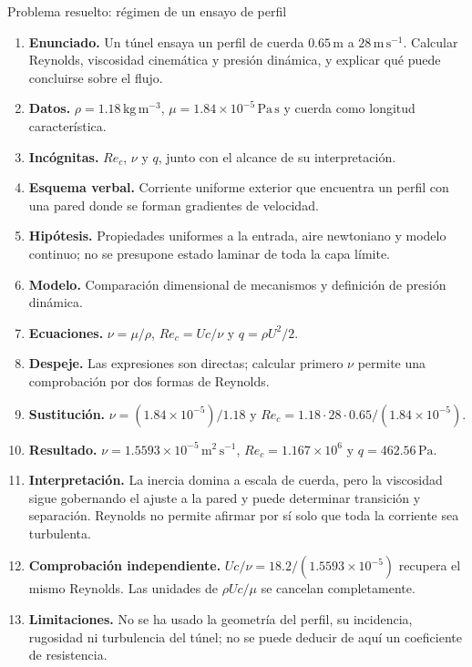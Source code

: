 \begin{studiumworked}{Problema resuelto: régimen de un ensayo de perfil}

\begin{enumerate}
\item \textbf{Enunciado.} Un túnel ensaya un perfil de cuerda $0.65\,\mathrm{m}$ a $28\,\mathrm{m\,s^{-1}}$. Calcular Reynolds, viscosidad cinemática y presión dinámica, y explicar qué puede concluirse sobre el flujo.
\item \textbf{Datos.} $\rho=1.18\,\mathrm{kg\,m^{-3}}$, $\mu=1.84\times10^{-5}\,\mathrm{Pa\,s}$ y cuerda como longitud característica.
\item \textbf{Incógnitas.} $Re_c$, $\nu$ y $q$, junto con el alcance de su interpretación.
\item \textbf{Esquema verbal.} Corriente uniforme exterior que encuentra un perfil con una pared donde se forman gradientes de velocidad.
\item \textbf{Hipótesis.} Propiedades uniformes a la entrada, aire newtoniano y modelo continuo; no se presupone estado laminar de toda la capa límite.
\item \textbf{Modelo.} Comparación dimensional de mecanismos y definición de presión dinámica.
\item \textbf{Ecuaciones.} $\nu=\mu/\rho$, $Re_c=Uc/\nu$ y $q=\rho U^2/2$.
\item \textbf{Despeje.} Las expresiones son directas; calcular primero $\nu$ permite una comprobación por dos formas de Reynolds.
\item \textbf{Sustitución.} $\nu=(1.84\times10^{-5})/1.18$ y $Re_c=1.18\cdot28\cdot0.65/(1.84\times10^{-5})$.
\item \textbf{Resultado.} $\nu=1.5593\times10^{-5}\,\mathrm{m^2\,s^{-1}}$, $Re_c=1.167\times10^6$ y $q=462.56\,\mathrm{Pa}$.
\item \textbf{Interpretación.} La inercia domina a escala de cuerda, pero la viscosidad sigue gobernando el ajuste a la pared y puede determinar transición y separación. Reynolds no permite afirmar por sí solo que toda la corriente sea turbulenta.
\item \textbf{Comprobación independiente.} $Uc/\nu=18.2/(1.5593\times10^{-5})$ recupera el mismo Reynolds. Las unidades de $\rho Uc/\mu$ se cancelan completamente.
\item \textbf{Limitaciones.} No se ha usado la geometría del perfil, su incidencia, rugosidad ni turbulencia del túnel; no se puede deducir de aquí un coeficiente de resistencia.
\end{enumerate}


\end{studiumworked}

